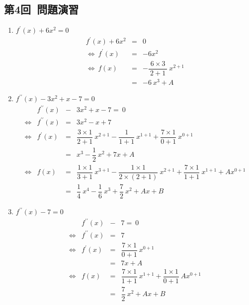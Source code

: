 \documentclass[a4paper,11pt]{ltjsarticle}
\begin{document}
\subsection{第4回\ 問題演習}

\begin{enumerate}
  \item $f^{\prime}(x)+6x^{2}=0$
\begin{equation}
  \renewcommand{\arraystretch}{2}
  \begin{array}{rcl}
    f^{\prime}(x) + 6x^{2}
    &=&
    0
    \\
    \Leftrightarrow\ f^{\prime}(x)
    &=&
    -6x^{2}
    \\
    \Leftrightarrow\ f(x)
    &=&
    -\dfrac{6 \times 3}{\ 2+1\ }\ x^{2+1}
    \\
    &=&
    -6\ x^{3}+A
  \end{array}
\end{equation}

\clearpage

  \item $f^{\prime \prime}(x)-3x^{2}+x-7=0$
\begin{equation}
  \renewcommand{\arraystretch}{2}
  \begin{array}{rccl}
    &
    f^{\prime \prime}(x)
    &-&
    3x^{2}+x-7 =\ 0
    \\
    \Leftrightarrow
    &
    f^{\prime \prime}(x)
    &=&
    3x^{2}-x+7
    \\
    \Leftrightarrow
    &
    f^{\prime}(x)
    &=&
    \dfrac{3 \times 1}{2+1}\ x^{2+1}-\dfrac{1}{1+1}\ x^{1+1}+\dfrac{7 \times 1}{0+1}\ x^{0+1}
    \\
    &
    &=&
    x^{3}-\dfrac{1}{2}\ x^{2}+7x+A
    \\
    \Leftrightarrow
    &
    f(x)
    &=&
    \dfrac{1 \times 1}{3+1}\ x^{3+1}-\dfrac{1 \times 1}{2 \times (2+1)}\ x^{2+1}+\dfrac{7 \times 1} {1+1}\ x^{1+1}+Ax^{0+1}
    \\
    &
    &=&
    \dfrac{1}{4}\ x^{4}-\dfrac{1}{6}\ x^{3}+\dfrac{7}{2}\ x^{2}+Ax+B
  \end{array}
\end{equation}
  \item $f^{\prime \prime}(x)-7=0$
\begin{equation}
  \renewcommand{\arraystretch}{2}
  \begin{array}{rccl}
    &
    f^{\prime \prime}(x)
    &-&
    7 =\ 0
    \\
    \Leftrightarrow
    &
    f^{\prime \prime}(x)
    &=&
    7
    \\
    \Leftrightarrow
    &
    f^{\prime}(x)
    &=&
    \dfrac{7 \times 1}{0+1}\ x^{0+1}
    \\
    &
    &=&
    7x+A
    \\
    \Leftrightarrow
    &
    f(x)
    &=&
    \dfrac{7 \times 1}{1+1}\ x^{1+1}+\dfrac{1 \times 1}{0+1}\ Ax^{0+1}
    \\
    &
    &=&
    \dfrac{7}{2}\ x^{2}+Ax+B
  \end{array}
\end{equation}


\end{enumerate}
\end{document}

